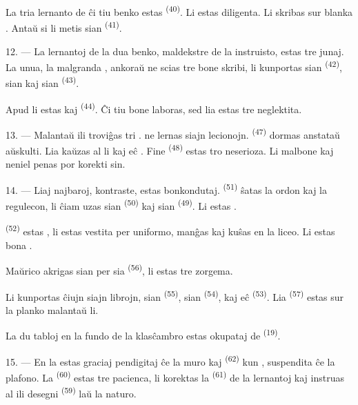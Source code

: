 La tria lernanto de ĉi tiu benko estas 
\textsuperscript{(40)}. Li estas diligenta. Li skribas sur blanka
. Antaŭ si li metis sian 
\textsuperscript{(41)}.

12. --- La lernantoj de la dua benko, maldekstre de la instruisto, estas tre
junaj. La unua, la malgranda , ankoraŭ ne scias tre bone
skribi, li kunportas sian  \textsuperscript{(42)}, sian
 kaj sian  \textsuperscript{(43)}.

Apud li estas  kaj  \textsuperscript{(44)}.
Ĉi tiu bone laboras, sed lia  estas tre neglektita.

13. --- Malantaŭ ili troviĝas tri . 
ne lernas siajn lecionojn.  \textsuperscript{(47)} dormas
anstataŭ aŭskulti. Lia  kaŭzas al li
 kaj eĉ . Fine 
\textsuperscript{(48)} estas tro neserioza. Li malbone  kaj
neniel penas por korekti sin.

14. --- Liaj najbaroj, kontraste, estas bonkondutaj. 
\textsuperscript{(51)} ŝatas la ordon kaj la regulecon, li ĉiam uzas sian
 \textsuperscript{(50)} kaj sian 
\textsuperscript{(49)}. Li estas .

 \textsuperscript{(52)} estas , li estas
vestita per uniformo, manĝas kaj kuŝas en la liceo. Li estas bona
.

Maŭrico akrigas sian  per sia 
\textsuperscript{(56)}, li estas tre zorgema.

Li kunportas ĉiujn siajn librojn, sian 
\textsuperscript{(55)}, sian  \textsuperscript{(54)}, kaj
eĉ  \textsuperscript{(53)}. Lia 
\textsuperscript{(57)} estas sur la planko malantaŭ li.

La du tabloj en la fundo de la klasĉambro estas okupataj de  \textsuperscript{(19)}.

\VUsaut{4.6mm}
\VUsaut{3.4mm}

15. --- En la  estas graciaj  pendigitaj
ĉe la muro kaj  \textsuperscript{(62)} kun ,
suspendita ĉe la plafono. La  \textsuperscript{(60)} estas
tre pacienca, li korektas la  \textsuperscript{(61)} de la
lernantoj kaj instruas al ili desegni  \textsuperscript{(59)}
laŭ la naturo.

